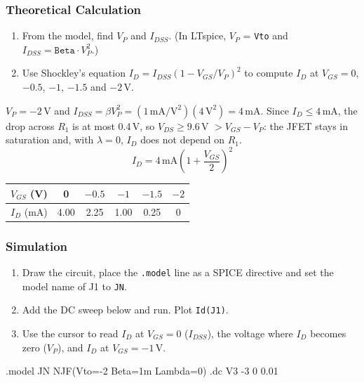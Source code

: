 \subsubsection*{Theoretical Calculation}
\begin{enumerate}[itemsep=2pt]
  \item From the model, find $V_P$ and $I_{DSS}$. (In LTspice, $V_P$ = \texttt{Vto} and $I_{DSS} = \texttt{Beta}\cdot V_P^2$.)
  \item Use Shockley's equation $I_D = I_{DSS}\left(1 - V_{GS}/V_P\right)^2$ to compute $I_D$ at
        $V_{GS} = 0$, $-0.5$, $-1$, $-1.5$ and $-2$\,V.
\end{enumerate}
\begin{solution}
$V_P = -2$\,V and $I_{DSS} = \beta V_P^2 = (1\,\mathrm{mA/V^2})(4\,\mathrm{V^2}) = 4$\,mA.
Since $I_D \le 4$\,mA, the drop across $R_1$ is at most 0.4\,V, so $V_{DS} \ge 9.6$\,V $> V_{GS}-V_P$: the JFET stays in saturation
and, with $\lambda = 0$, $I_D$ does not depend on $R_1$.
\[
  I_D = 4\,\mathrm{mA}\left(1+\frac{V_{GS}}{2}\right)^2
\]
\begin{center}
\begin{tabular}{c c c c c c}
\toprule
$V_{GS}$ (V) & 0 & $-0.5$ & $-1$ & $-1.5$ & $-2$\\ \midrule
$I_D$ (mA) & 4.00 & 2.25 & 1.00 & 0.25 & 0\\
\bottomrule
\end{tabular}
\end{center}
\end{solution}

\subsubsection*{Simulation}
\begin{enumerate}[itemsep=2pt]
  \item Draw the circuit, place the \texttt{.model} line as a SPICE directive and set the model name of J1 to \texttt{JN}.
  \item Add the DC sweep below and run. Plot \texttt{Id(J1)}.
  \item Use the cursor to read $I_D$ at $V_{GS}=0$ ($I_{DSS}$), the voltage where $I_D$ becomes zero ($V_P$), and $I_D$ at $V_{GS}=-1$\,V.
\end{enumerate}
\begin{spice}
.model JN NJF(Vto=-2 Beta=1m Lambda=0)
.dc V3 -3 0 0.01
\end{spice}


